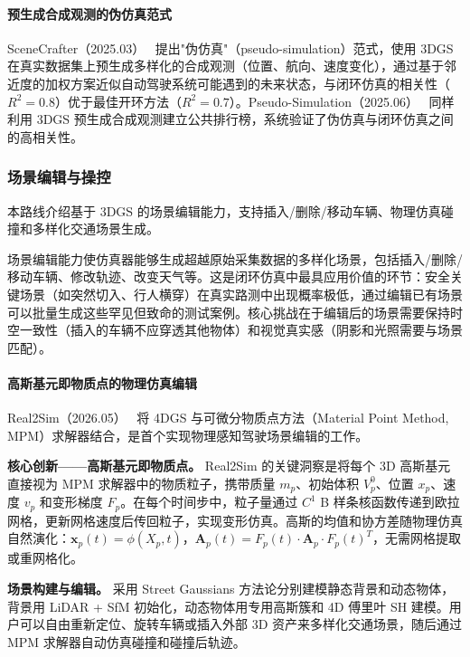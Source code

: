 \paragraph{预生成合成观测的伪仿真范式}

SceneCrafter（2025.03）~\cite{2503_18108} 提出"伪仿真"（pseudo-simulation）范式，使用 3DGS 在真实数据集上预生成多样化的合成观测（位置、航向、速度变化），通过基于邻近度的加权方案近似自动驾驶系统可能遇到的未来状态，与闭环仿真的相关性（$R^2=0.8$）优于最佳开环方法（$R^2=0.7$）。Pseudo-Simulation（2025.06）~\cite{2506_04218} 同样利用 3DGS 预生成合成观测建立公共排行榜，系统验证了伪仿真与闭环仿真之间的高相关性。

\subsubsection{场景编辑与操控}

本路线介绍基于 3DGS 的场景编辑能力，支持插入/删除/移动车辆、物理仿真碰撞和多样化交通场景生成。

场景编辑能力使仿真器能够生成超越原始采集数据的多样化场景，包括插入/删除/移动车辆、修改轨迹、改变天气等。这是闭环仿真中最具应用价值的环节：安全关键场景（如突然切入、行人横穿）在真实路测中出现概率极低，通过编辑已有场景可以批量生成这些罕见但致命的测试案例。核心挑战在于编辑后的场景需要保持时空一致性（插入的车辆不应穿透其他物体）和视觉真实感（阴影和光照需要与场景匹配）。

\paragraph{高斯基元即物质点的物理仿真编辑}

Real2Sim（2026.05）~\cite{2605_13591} 将 4DGS 与可微分物质点方法（Material Point Method, MPM）求解器结合，是首个实现物理感知驾驶场景编辑的工作。

\textbf{核心创新——高斯基元即物质点。} Real2Sim 的关键洞察是将每个 3D 高斯基元直接视为 MPM 求解器中的物质粒子，携带质量 $m_p$、初始体积 $V_p^0$、位置 $x_p$、速度 $v_p$ 和变形梯度 $F_p$。在每个时间步中，粒子量通过 $C^1$ B 样条核函数传递到欧拉网格，更新网格速度后传回粒子，实现变形仿真。高斯的均值和协方差随物理仿真自然演化：$\mathbf{x}_p(t) = \phi(X_p, t)$，$\mathbf{A}_p(t) = F_p(t) \cdot \mathbf{A}_p \cdot F_p(t)^T$，无需网格提取或重网格化。

\textbf{场景构建与编辑。} 采用 Street Gaussians 方法论分别建模静态背景和动态物体，背景用 LiDAR + SfM 初始化，动态物体用专用高斯簇和 4D 傅里叶 SH 建模。用户可以自由重新定位、旋转车辆或插入外部 3D 资产来多样化交通场景，随后通过 MPM 求解器自动仿真碰撞和碰撞后轨迹。

